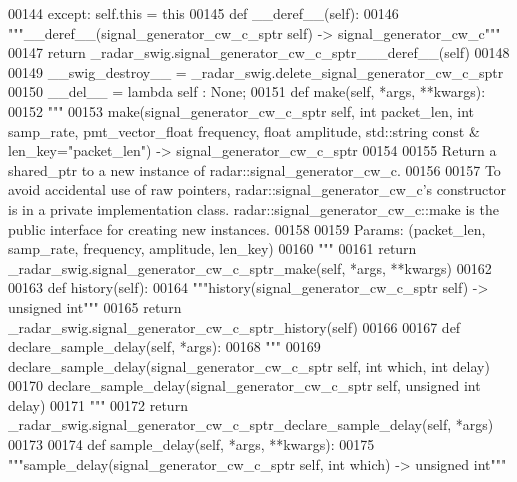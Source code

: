\begin{DoxyCode}
{{{00144         \textcolor{keywordflow}{except}: self.this = this
00145     \textcolor{keyword}{def }__deref__(self):
00146         \textcolor{stringliteral}{"""\_\_deref\_\_(signal\_generator\_cw\_c\_sptr self) -> signal\_generator\_cw\_c"""}
00147         \textcolor{keywordflow}{return} \_radar\_swig.signal\_generator\_cw\_c\_sptr\_\_\_deref\_\_(self)
00148 
00149     \_\_swig\_destroy\_\_ = \_radar\_swig.delete\_signal\_generator\_cw\_c\_sptr
00150     \_\_del\_\_ = \textcolor{keyword}{lambda} self : \textcolor{keywordtype}{None};
00151     \textcolor{keyword}{def }make(self, *args, **kwargs):
00152         \textcolor{stringliteral}{"""}
00153 \textcolor{stringliteral}{        make(signal\_generator\_cw\_c\_sptr self, int packet\_len, int samp\_rate, pmt\_vector\_float frequency,
       float amplitude, std::string const & len\_key="packet\_len") -> signal\_generator\_cw\_c\_sptr}
00154 \textcolor{stringliteral}{}
00155 \textcolor{stringliteral}{        Return a shared\_ptr to a new instance of radar::signal\_generator\_cw\_c.}
00156 \textcolor{stringliteral}{}
00157 \textcolor{stringliteral}{        To avoid accidental use of raw pointers, radar::signal\_generator\_cw\_c's constructor is in a private
       implementation class. radar::signal\_generator\_cw\_c::make is the public interface for creating new
       instances.}
00158 \textcolor{stringliteral}{}
00159 \textcolor{stringliteral}{        Params: (packet\_len, samp\_rate, frequency, amplitude, len\_key)}
00160 \textcolor{stringliteral}{        """}
00161         \textcolor{keywordflow}{return} \_radar\_swig.signal\_generator\_cw\_c\_sptr\_make(self, *args, **kwargs)
00162 
00163     \textcolor{keyword}{def }history(self):
00164         \textcolor{stringliteral}{"""history(signal\_generator\_cw\_c\_sptr self) -> unsigned int"""}
00165         \textcolor{keywordflow}{return} \_radar\_swig.signal\_generator\_cw\_c\_sptr\_history(self)
00166 
00167     \textcolor{keyword}{def }declare_sample_delay(self, *args):
00168         \textcolor{stringliteral}{"""}
00169 \textcolor{stringliteral}{        declare\_sample\_delay(signal\_generator\_cw\_c\_sptr self, int which, int delay)}
00170 \textcolor{stringliteral}{        declare\_sample\_delay(signal\_generator\_cw\_c\_sptr self, unsigned int delay)}
00171 \textcolor{stringliteral}{        """}
00172         \textcolor{keywordflow}{return} \_radar\_swig.signal\_generator\_cw\_c\_sptr\_declare\_sample\_delay(self, *args)
00173 
00174     \textcolor{keyword}{def }sample_delay(self, *args, **kwargs):
00175         \textcolor{stringliteral}{"""sample\_delay(signal\_generator\_cw\_c\_sptr self, int which) -> unsigned int"""}
}}}
\end{DoxyCode}
